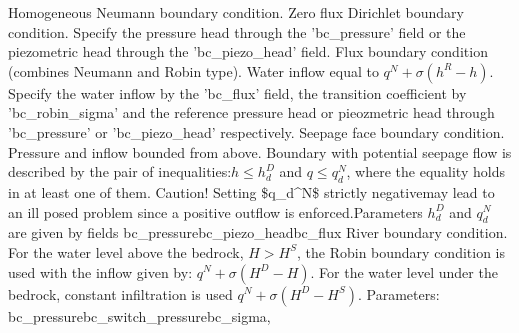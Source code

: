 \begin{SelectionType}
	{}
	{}
		\KeyItem
			{}
			{{{Homogeneous Neumann boundary condition. Zero flux}}}
		\KeyItem
			{}
			{{{Dirichlet boundary condition. Specify the pressure head through the 'bc{\_}pressure' field or the piezometric head through the 'bc{\_}piezo{\_}head' field.}}}
		\KeyItem
			{}
			{{{Flux boundary condition (combines Neumann and Robin type). Water inflow equal to }{$q^N + \sigma (h^R - h)$}{. Specify the water inflow by the 'bc{\_}flux' field, the transition coefficient by 'bc{\_}robin{\_}sigma' and the reference pressure head or pieozmetric head through 'bc{\_}pressure' or 'bc{\_}piezo{\_}head' respectively.}}}
		\KeyItem
			{}
			{{{Seepage face boundary condition. Pressure and inflow bounded from above. Boundary with potential seepage flow is described by the pair of inequalities:}{$h \le h_d^D$}{ and }{$ q \le q_d^N$}{, where the equality holds in at least one of them. Caution! Setting {\$}q{\_}d{\^{}}N{\$} strictly negativemay lead to an ill posed problem since a positive outflow is enforced.Parameters }{$h_d^D$}{ and }{$q_d^N$}{ are given by fields }\ttfamily bc{\_}pressure\ttfamily bc{\_}piezo{\_}head\ttfamily bc{\_}flux}}
		\KeyItem
			{}
			{{{River boundary condition. For the water level above the bedrock, }{$H > H^S$}{, the Robin boundary condition is used with the inflow given by: }{ $q^N + \sigma(H^D - H)$}{. For the water level under the bedrock, constant infiltration is used }{ $q^N + \sigma(H^D - H^S)$}{. Parameters: }\ttfamily bc{\_}pressure\ttfamily bc{\_}switch{\_}pressure\ttfamily bc{\_}sigma,}}
\end{SelectionType}
